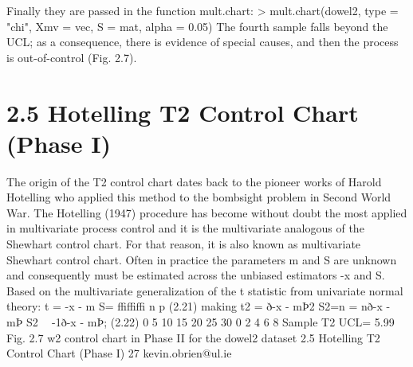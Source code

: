 \documentclass[a4paper,12pt]{article}
\begin{document}


Finally they are passed in the function mult.chart:
> mult.chart(dowel2, type = "chi", Xmv = vec, S = mat, alpha = 0.05)
The fourth sample falls beyond the UCL; as a consequence, there is evidence of
special causes, and then the process is out-of-control (Fig. 2.7).
\section*{2.5 Hotelling T2 Control Chart (Phase I)}
The origin of the T2 control chart dates back to the pioneer works of Harold Hotelling
who applied this method to the bombsight problem in Second World War. The
Hotelling (1947) procedure has become without doubt the most applied in multivariate
process control and it is the multivariate analogous of the Shewhart control chart.
For that reason, it is also known as multivariate Shewhart control chart.
Often in practice the parameters m and S are unknown and consequently must be
estimated across the unbiased estimators -x and S. Based on the multivariate
generalization of the t statistic from univariate normal theory:
t = -x - m
S=
ffiffiffi
n
p (2.21)
making
t2 =
ð-x - mÞ2
S2=n
= nð-x - mÞ S2  -1ð-x - mÞ; (2.22)
0 5 10 15 20 25 30
0
2
4
6
8
Sample
T2
UCL= 5.99
Fig. 2.7 w2 control chart
in Phase II for the dowel2
dataset
2.5 Hotelling T2 Control Chart (Phase I) 27
kevin.obrien@ul.ie
\end{document}
